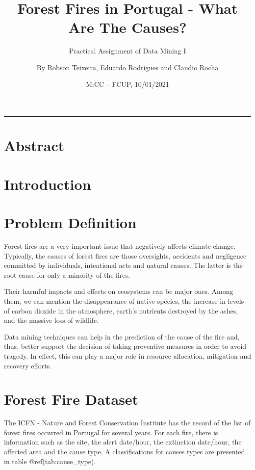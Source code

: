 \documentclass[
  12pt,
]{report}
\title{Forest Fires in Portugal - What Are The Causes?}
\subtitle{Practical Assignment of Data Mining I}
\author{By Robson Teixeira, Eduardo Rodrigues and Claudio Rocha}
\date{M:CC -- FCUP, 10/01/2021}
\begin{document}
\maketitle

{
\hypersetup{linkcolor=}
\setcounter{tocdepth}{1}
\tableofcontents
}
\begin{center}\rule{0.5\linewidth}{0.5pt}\end{center}

\hypertarget{abstract}{%
\chapter*{Abstract}\label{abstract}}

\hypertarget{introduction}{%
\chapter{Introduction}\label{introduction}}

\hypertarget{problem-definition}{%
\chapter{Problem Definition}\label{problem-definition}}

Forest fires are a very important issue that negatively affects climate
change. Typically, the causes of forest fires are those oversights,
accidents and negligence committed by individuals, intentional acts and
natural causes. The latter is the root cause for only a minority of the
fires.

Their harmful impacts and effects on ecosystems can be major ones. Among
them, we can mention the disappearance of native species, the increase
in levels of carbon dioxide in the atmosphere, earth's nutrients
destroyed by the ashes, and the massive loss of wildlife.

Data mining techniques can help in the prediction of the cause of the
fire and, thus, better support the decision of taking preventive
measures in order to avoid tragedy. In effect, this can play a major
role in resource allocation, mitigation and recovery efforts.

\hypertarget{forest-fire-dataset}{%
\chapter{Forest Fire Dataset}\label{forest-fire-dataset}}

The ICFN - Nature and Forest Conservation Institute has the record of
the list of forest fires occurred in Portugal for several years. For
each fire, there is information such as the site, the alert date/hour,
the extinction date/hour, the affected area and the cause type. A
classifications for causes types are presented in table
@ref(tab:cause\_type).
\end{document}
